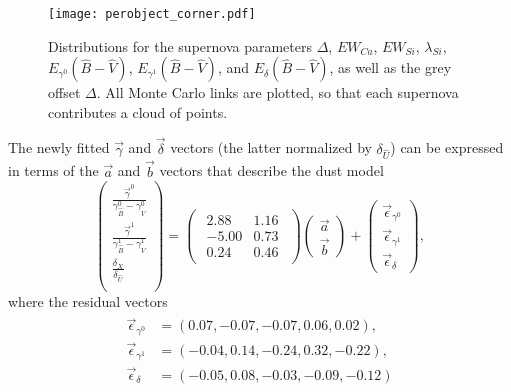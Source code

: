 \documentclass{aastex61}   	%
\begin{document}
\begin{figure}[htbp] %
   \centering
   \texttt{[image: perobject\_corner.pdf]} 
   \caption{
   Distributions for the supernova parameters $\Delta$, $EW_{Ca}$, $EW_{Si}$, $\lambda_{Si}$, $E_{\gamma^0}({\hat{B}}-{\hat{V}})$,  $E_{\gamma^1}({\hat{B}}-{\hat{V}})$,  and $E_{\delta}({\hat{B}}-{\hat{V}})$, as well as the grey offset
$\Delta$.  All Monte Carlo links are plotted, so that each supernova contributes a cloud of points.
   \label{perobject2:fig}}
\end{figure}


The newly fitted $\vec{\gamma}$ and  $\vec{\delta}$ vectors (the latter normalized by $\delta_{\hat{U}}$) can be expressed 
in terms of the $\vec{a}$ and $\vec{b}$ vectors that describe the  dust model
\begin{equation}
\begin{pmatrix}
 \frac{\vec{\gamma}^0}{\gamma^0_{\hat{B}}-\gamma^0_{\hat{V}}} \\
\frac{\vec{\gamma}^1}{\gamma^1_{\hat{B}}-\gamma^1_{\hat{V}}} \\
\frac{\delta_X}{\delta_{\hat{U}}} \\
\end{pmatrix}=
\begin{pmatrix}
\begin{array}{rr}
2.88 & 1.16 \\
-5.00 & 0.73 \\
0.24 & 0.46
\end{array}
\end{pmatrix} 
\begin{pmatrix}
\vec{a} \\
\vec{b}
\end{pmatrix}+
\begin{pmatrix}
\vec{\epsilon}_{\gamma^0} \\
\vec{\epsilon}_{\gamma^1} \\
\vec{\epsilon}_{\delta}
\end{pmatrix},
\label{model2trans:eqn}
\end{equation}
where the residual vectors
\begin{align}
\begin{split}
\vec{\epsilon}_{\gamma^0} &=(0.07, -0.07, -0.07,  0.06,  0.02),\\
\vec{\epsilon}_{\gamma^1} &=( -0.04, 0.14,  -0.24,  0.32, -0.22),\\
\vec{\epsilon}_{\delta} &=(-0.05, 0.08,  -0.03,  -0.09, -0.12)
\end{split}
\label{model2res:eqn}
\end{align}
\end{document}

